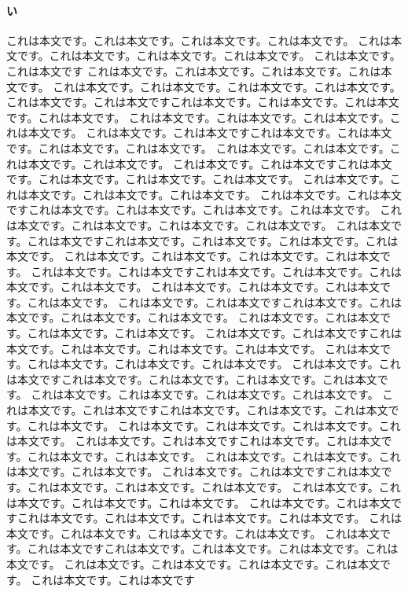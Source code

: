\documentclass[a4paper,11pt]{ltjsarticle}
\begin{document}
\paragraph{い}
これは本文です。これは本文です。これは本文です。これは本文です。
これは本文です。これは本文です。これは本文です。これは本文です。
これは本文です。これは本文です
これは本文です。これは本文です。これは本文です。これは本文です。
これは本文です。これは本文です。これは本文です。これは本文です。
これは本文です。これは本文ですこれは本文です。これは本文です。これは本文です。これは本文です。
これは本文です。これは本文です。これは本文です。これは本文です。
これは本文です。これは本文ですこれは本文です。これは本文です。これは本文です。これは本文です。
これは本文です。これは本文です。これは本文です。これは本文です。
これは本文です。これは本文ですこれは本文です。これは本文です。これは本文です。これは本文です。
これは本文です。これは本文です。これは本文です。これは本文です。
これは本文です。これは本文ですこれは本文です。これは本文です。これは本文です。これは本文です。
これは本文です。これは本文です。これは本文です。これは本文です。
これは本文です。これは本文ですこれは本文です。これは本文です。これは本文です。これは本文です。
これは本文です。これは本文です。これは本文です。これは本文です。
これは本文です。これは本文ですこれは本文です。これは本文です。これは本文です。これは本文です。
これは本文です。これは本文です。これは本文です。これは本文です。
これは本文です。これは本文ですこれは本文です。これは本文です。これは本文です。これは本文です。
これは本文です。これは本文です。これは本文です。これは本文です。
これは本文です。これは本文ですこれは本文です。これは本文です。これは本文です。これは本文です。
これは本文です。これは本文です。これは本文です。これは本文です。
これは本文です。これは本文ですこれは本文です。これは本文です。これは本文です。これは本文です。
これは本文です。これは本文です。これは本文です。これは本文です。
これは本文です。これは本文ですこれは本文です。これは本文です。これは本文です。これは本文です。
これは本文です。これは本文です。これは本文です。これは本文です。
これは本文です。これは本文ですこれは本文です。これは本文です。これは本文です。これは本文です。
これは本文です。これは本文です。これは本文です。これは本文です。
これは本文です。これは本文ですこれは本文です。これは本文です。これは本文です。これは本文です。
これは本文です。これは本文です。これは本文です。これは本文です。
これは本文です。これは本文ですこれは本文です。これは本文です。これは本文です。これは本文です。
これは本文です。これは本文です。これは本文です。これは本文です。
これは本文です。これは本文ですこれは本文です。これは本文です。これは本文です。これは本文です。
これは本文です。これは本文です。これは本文です。これは本文です。
これは本文です。これは本文です
\end{document}
